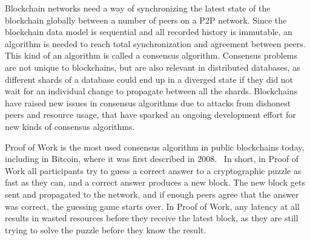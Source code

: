 Blockchain networks need a way of synchronizing the latest state of the blockchain globally between a number of peers on a P2P network. Since the blockchain data model is sequential and all recorded history is immutable, an algorithm is needed to reach total synchronization and agreement between peers. This kind of an algorithm is called a consensus algorithm. Consensus problems are not unique to blockchains, but are also relevant in distributed databases, as different shards of a database could end up in a diverged state if they did not wait for an individual change to propagate between all the shards. Blockchains have raised new issues in consensus algorithms due to attacks from dishonest peers and resource usage, that have sparked an ongoing development effort for new kinds of consensus algorithms.

Proof of Work is the most used consensus algorithm in public blockchains today, including in Bitcoin, where it was first described in 2008.~\cite{Nakamoto2019-ax} In short, in Proof of Work all participants try to guess a correct answer to a cryptographic puzzle as fast as they can, and a correct answer produces a new block. The new block gets sent and propagated to the network, and if enough peers agree that the answer was correct, the guessing game starts over. In Proof of Work, any latency at all results in wasted resources before they receive the latest block, as they are still trying to solve the puzzle before they know the result.

